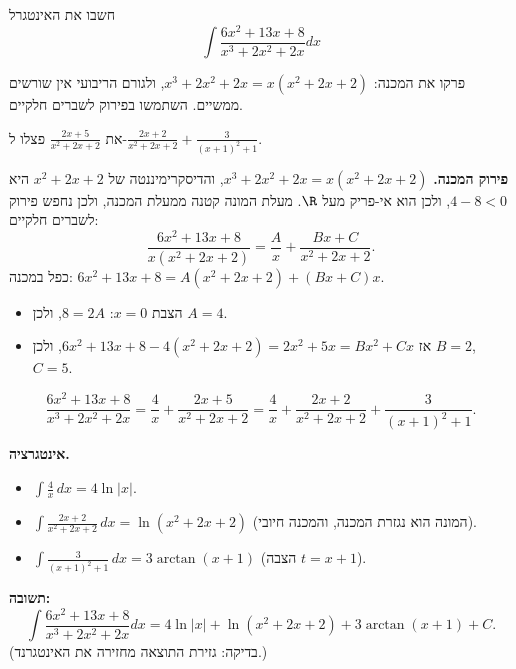 
\begin{question}
חשבו את האינטגרל
\[ \int\frac{6x^2+13x+8}{x^3+2x^2+2x}dx \]
\end{question}

\begin{hint}
פרקו את המכנה: $x^3+2x^2+2x=x(x^2+2x+2)$, ולגורם הריבועי אין שורשים ממשיים. השתמשו בפירוק לשברים חלקיים.
\end{hint}

\begin{hint}
את $\frac{2x+5}{x^2+2x+2}$ פצלו ל-$\frac{2x+2}{x^2+2x+2}+\frac{3}{(x+1)^2+1}$.
\end{hint}

\begin{solution}
\textbf{פירוק המכנה.} $x^3+2x^2+2x=x(x^2+2x+2)$, והדיסקרימיננטה של $x^2+2x+2$ היא $4-8<0$, ולכן הוא אי-פריק מעל $\R$. מעלת המונה קטנה ממעלת המכנה, ולכן נחפש פירוק לשברים חלקיים:
\[ \frac{6x^2+13x+8}{x(x^2+2x+2)}=\frac{A}{x}+\frac{Bx+C}{x^2+2x+2}. \]
כפל במכנה: $6x^2+13x+8=A(x^2+2x+2)+(Bx+C)x$.
\begin{itemize}
  \item הצבת $x=0$: $8=2A$, ולכן $A=4$.
  \item אז $6x^2+13x+8-4(x^2+2x+2)=2x^2+5x=Bx^2+Cx$, ולכן $B=2$, $C=5$.
\end{itemize}
\[ \frac{6x^2+13x+8}{x^3+2x^2+2x}=\frac4x+\frac{2x+5}{x^2+2x+2}=\frac4x+\frac{2x+2}{x^2+2x+2}+\frac{3}{(x+1)^2+1}. \]

\textbf{אינטגרציה.}
\begin{itemize}
  \item $\int\frac4x\,dx=4\ln|x|$.
  \item $\int\frac{2x+2}{x^2+2x+2}\,dx=\ln(x^2+2x+2)$ (המונה הוא נגזרת המכנה, והמכנה חיובי).
  \item $\int\frac{3}{(x+1)^2+1}\,dx=3\arctan(x+1)$ (הצבה $t=x+1$).
\end{itemize}

\textbf{תשובה:}
\[ \int\frac{6x^2+13x+8}{x^3+2x^2+2x}dx=\boxed{4\ln|x|+\ln(x^2+2x+2)+3\arctan(x+1)+C}. \]
(בדיקה: גזירת התוצאה מחזירה את האינטגרנד.)
\end{solution}
